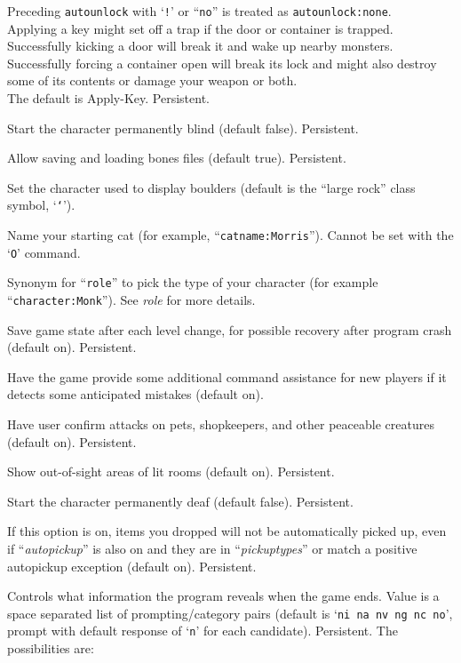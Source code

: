 \documentclass[titlepage]{article}
\begin{document}
\begin{description}[font=\mdseries\itshape]
Preceding \texttt{autounlock} with `\texttt{!}' or ``\texttt{no}'' is treated as
\texttt{autounlock:none}.
\\
Applying a key might set off a trap if the door or container is trapped.
Successfully kicking a door will break it and wake up nearby monsters.
Successfully forcing a container open will break its lock and might also
destroy some of its contents or damage your weapon or both.
\\
The default is Apply-Key.
Persistent.
\item[blind]
Start the character permanently blind (default false).  Persistent.
\item[bones]
Allow saving and loading bones files (default true).  Persistent.
\item[boulder]
Set the character used to display boulders (default is the ``large rock''
class symbol, `\texttt{`}').
\item[catname]
Name your starting cat (for example, ``\texttt{catname:Morris}'').
Cannot be set with the `\texttt{O}' command.
\item[character]
Synonym for ``\texttt{role}'' to pick the type of your character
(for example ``\texttt{character:Monk}'').  See \textit{role} for more details.
\item[checkpoint]
Save game state after each level change, for possible recovery after
program crash (default on).  Persistent.
\item[cmdassist]
Have the game provide some additional command assistance for new
players if it detects some anticipated mistakes (default on).
\item[confirm]
Have user confirm attacks on pets, shopkeepers, and other
peaceable creatures (default on).  Persistent.
\item[dark\textunderscore room]
Show out-of-sight areas of lit rooms (default on).  Persistent.
\item[deaf]
Start the character permanently deaf (default false).  Persistent.
\item[dropped\textunderscore nopick]
If this option is on, items you dropped will not be automatically picked up,
even if ``\textit{autopickup}'' is also on and they are in
``\textit{pickup\textunderscore types}'' or match a positive autopickup exception
(default on).  Persistent.
\item[disclose]
Controls what information the program reveals when the game ends.
Value is a space separated list of prompting/category pairs
(default is `\texttt{ni na nv ng nc no}',
prompt with default response of `\texttt{n}' for each candidate).
Persistent.
The possibilities are:


\end{description}
\end{document}
